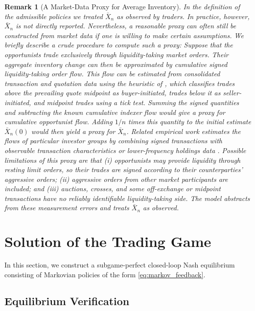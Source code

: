 \documentclass[12pt]{article}
\numberwithin{equation}{section}
\newtheorem{remark}[theorem]{Remark}
\theoremstyle{definition}
\begin{document}
\begin{remark}[A Market-Data Proxy for Average Inventory]
\label{rem:average_inventory_proxy}
In the definition of the admissible policies we treated \(\bar X_n\)
as observed by traders. In practice, however, \(\bar X_n\) is not directly
reported. Nevertheless, a reasonable proxy can often still be
constructed from market data if one is willing to make certain assumptions.
We briefly describe a crude procedure to compute such a proxy:
Suppose that the opportunists trade exclusively through liquidity-taking
market orders. Their aggregate inventory change can then be approximated by cumulative signed
liquidity-taking order flow. This flow can be estimated from consolidated
transaction and quotation data using the heuristic of \citet{lee_ready_1991},
which classifies trades above the prevailing quote midpoint as buyer-initiated,
trades below it as seller-initiated, and midpoint trades using a tick test.
Summing the signed quantities and subtracting the known cumulative indexer flow
would give a proxy for cumulative opportunist flow. Adding \(1/n\) times this
quantity to the initial estimate \(\bar X_n(0)\) would then yield a proxy for
\(\bar X_n\). Related empirical work estimates the flows of particular investor
groups by combining signed
transactions with observable transaction characteristics or lower-frequency
holdings data
\citep{campbell_ramadorai_schwartz_2009,boehmer_jones_zhang_zhang_2021}.
Possible limitations of this proxy are that (i) opportunists may provide
liquidity through resting limit orders, so their trades are signed according to
their counterparties' aggressive orders; (ii) aggressive orders from other
market participants are included; and (iii) auctions, crosses, and some
off-exchange or midpoint transactions have no reliably identifiable
liquidity-taking side. The model abstracts from these measurement errors and
treats \(\bar X_n\) as observed.
\end{remark}

\section{Solution of the Trading Game}\label{sec:solution}

In this section, we construct a subgame-perfect closed-loop Nash equilibrium
consisting of Markovian policies of the form \eqref{eq:markov_feedback}.

\subsection{Equilibrium Verification}
\label{sec:fundamental_price_reduction}
\end{document}
